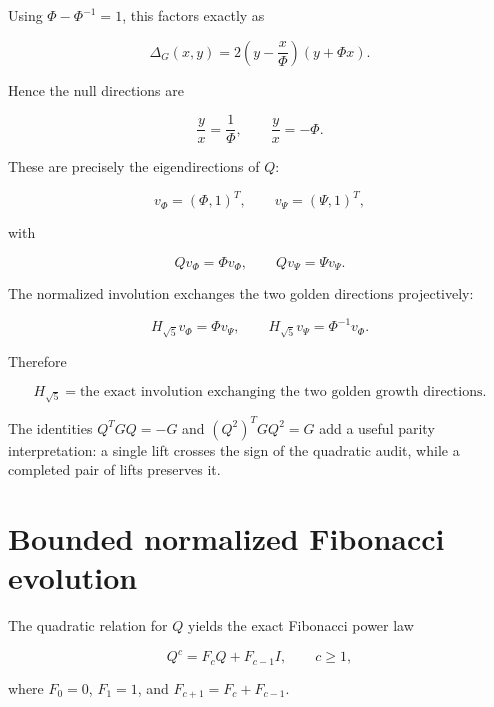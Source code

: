 \documentclass[11pt,letterpaper]{article}
\theoremstyle{clearonyx}
\begin{document}
Using $\Phi-\Phi^{-1}=1$, this factors exactly as

\begin{equation}
\boxed{
\Delta_G(x,y)
=2\left(y-\frac{x}{\Phi}\right)\left(y+\Phi x\right).
}
\end{equation}

Hence the null directions are

\begin{equation}
\frac{y}{x}=\frac1\Phi,
\qquad
\frac{y}{x}=-\Phi.
\end{equation}

These are precisely the eigendirections of $Q$:

\begin{equation}
v_\Phi=(\Phi,1)^T,
\qquad
v_\Psi=(\Psi,1)^T,
\end{equation}

with

\begin{equation}
Qv_\Phi=\Phi v_\Phi,
\qquad
Qv_\Psi=\Psi v_\Psi.
\end{equation}

The normalized involution exchanges the two golden directions projectively:

\begin{equation}
H_{\sqrt5}v_\Phi=\Phi v_\Psi,
\qquad
H_{\sqrt5}v_\Psi=\Phi^{-1}v_\Phi.
\end{equation}

Therefore

\begin{equation}
\boxed{
H_{\sqrt5}=\text{the exact involution exchanging the two golden growth directions}.
}
\end{equation}

The identities $Q^TGQ=-G$ and $(Q^2)^TGQ^2=G$ add a useful parity interpretation: a single lift crosses the sign of the quadratic audit, while a completed pair of lifts preserves it.

\section{Bounded normalized Fibonacci evolution}

The quadratic relation for $Q$ yields the exact Fibonacci power law

\begin{equation}
Q^c=F_cQ+F_{c-1}I,
\qquad c\ge1,
\end{equation}

where $F_0=0$, $F_1=1$, and $F_{c+1}=F_c+F_{c-1}$.
\end{document}
